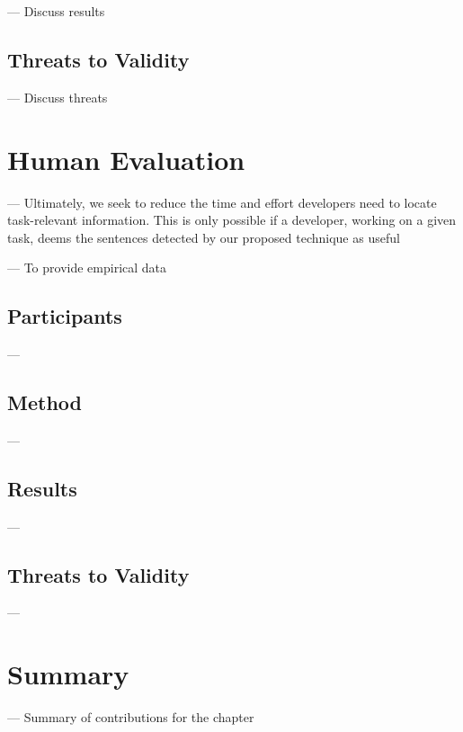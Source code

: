 --- Discuss results \vspace{3mm}

\subsection{Threats to Validity}

--- Discuss threats \vspace{3mm}

\section{Human Evaluation}

--- Ultimately, we seek to reduce the time and effort developers need to locate task-relevant information.
This is only possible if a developer, working on a given task, deems the sentences detected by our proposed technique as useful \vspace{3mm}

--- To provide empirical data

 

\subsection{Participants}

---  \vspace{3mm}

\subsection{Method}

---  \vspace{3mm}

\subsection{Results}

---  \vspace{3mm}

\subsection{Threats to Validity}

---  \vspace{3mm}

\section{Summary}

--- Summary of contributions for the chapter \vspace{3mm}